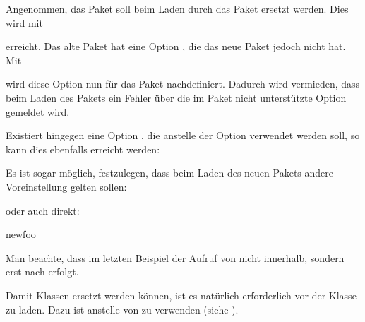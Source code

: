 \begin{Example}
  Angenommen, das Paket  soll beim Laden durch das
  Paket  ersetzt werden. Dies wird mit
\begin{lstcode}
\end{lstcode}
  erreicht. Das alte Paket hat eine Option , die das neue Paket
  jedoch nicht hat. Mit
\begin{lstcode}
\end{lstcode}
  wird diese Option nun für das Paket  nachdefiniert. Dadurch
  wird vermieden, dass beim Laden des Pakets  ein Fehler über
  die im Paket  nicht unterstützte Option gemeldet wird.

  Existiert hingegen eine Option , die anstelle der Option
   verwendet werden soll, so kann dies ebenfalls erreicht
  werden:
\begin{lstcode}
\end{lstcode}
  Es ist sogar möglich, festzulegen, dass beim Laden des neuen Pakets
  andere Voreinstellung gelten sollen:
\begin{lstcode}
\end{lstcode}
  oder auch direkt:
\begin{lstcode}
                       {newfoo}%
\end{lstcode}
  Man beachte, dass im letzten Beispiel der Aufruf von
   nicht innerhalb, sondern erst nach
   erfolgt.      
\end{Example}

Damit Klassen ersetzt werden können, ist es natürlich erforderlich
 vor der Klasse zu laden. Dazu ist
 anstelle von
 zu verwenden (siehe \cite{latex:clsguide}).%
\EndIndexGroup


